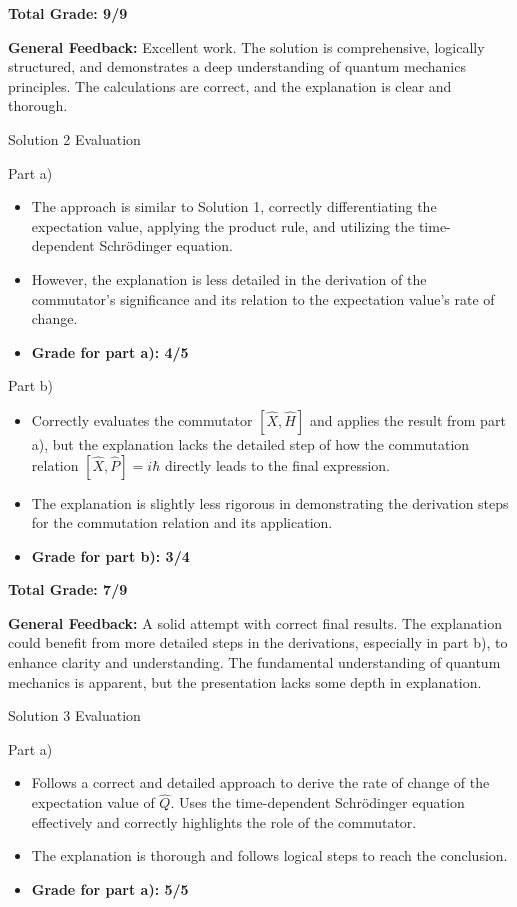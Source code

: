 \documentclass[a4paper,11pt]{article}
\begin{document}
\textbf{Total Grade: 9/9}

\textbf{General Feedback:}
Excellent work. The solution is comprehensive, logically structured, and demonstrates a deep understanding of quantum mechanics principles. The calculations are correct, and the explanation is clear and thorough.

Solution 2 Evaluation

Part a)

\begin{itemize}
    \item The approach is similar to Solution 1, correctly differentiating the expectation value, applying the product rule, and utilizing the time-dependent Schrödinger equation.
    \item However, the explanation is less detailed in the derivation of the commutator's significance and its relation to the expectation value's rate of change.
    \item \textbf{Grade for part a): 4/5}
\end{itemize}

Part b)

\begin{itemize}
    \item Correctly evaluates the commutator \(\left[ \hat{X}, \hat{H}\right]\) and applies the result from part a), but the explanation lacks the detailed step of how the commutation relation \(\left[ \hat{X}, \hat{P} \right] = i\hbar\) directly leads to the final expression.
    \item The explanation is slightly less rigorous in demonstrating the derivation steps for the commutation relation and its application.
    \item \textbf{Grade for part b): 3/4}
\end{itemize}

\textbf{Total Grade: 7/9}

\textbf{General Feedback:}
A solid attempt with correct final results. The explanation could benefit from more detailed steps in the derivations, especially in part b), to enhance clarity and understanding. The fundamental understanding of quantum mechanics is apparent, but the presentation lacks some depth in explanation.

Solution 3 Evaluation

Part a)

\begin{itemize}
    \item Follows a correct and detailed approach to derive the rate of change of the expectation value of \( \hat{Q} \). Uses the time-dependent Schrödinger equation effectively and correctly highlights the role of the commutator.
    \item The explanation is thorough and follows logical steps to reach the conclusion.
    \item \textbf{Grade for part a): 5/5}
\end{itemize}
\end{document}
